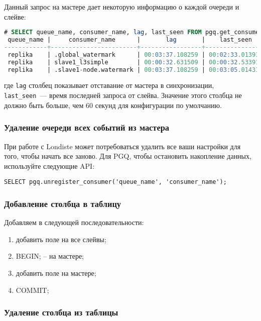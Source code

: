 Данный запрос на мастере дает некоторую информацию о каждой очереди и слейве:

\begin{lstlisting}[language=SQL,label=lst:londiste21,caption=Проверка состояния слейвов]
# SELECT queue_name, consumer_name, lag, last_seen FROM pgq.get_consumer_info();
 queue_name |     consumer_name      |       lag       |    last_seen
------------+------------------------+-----------------+-----------------
 replika    | .global_watermark      | 00:03:37.108259 | 00:02:33.013915
 replika    | slave1_l3simple        | 00:00:32.631509 | 00:00:32.533911
 replika    | .slave1-node.watermark | 00:03:37.108259 | 00:03:05.01431
\end{lstlisting}

где \lstinline!lag! столбец показывает отставание от мастера в синхронизации, \lstinline!last_seen!~--- время последней запроса от слейва. Значение этого столбца не должно быть больше, чем 60 секунд для конфигурации по умолчанию.

\subsubsection{Удаление очереди всех событий из мастера}

При работе с Londiste может потребоваться удалить все ваши настройки для того, чтобы начать все заново. Для PGQ, чтобы остановить накопление данных, используйте следующие API:

\begin{lstlisting}[label=lst:londiste22,caption=Удаление очереди всех событий из мастера]
SELECT pgq.unregister_consumer('queue_name', 'consumer_name');
\end{lstlisting}

\subsubsection{Добавление столбца в таблицу}

Добавляем в следующей последовательности:

\begin{enumerate}
 \item добавить поле на все слейвы;
 \item BEGIN; -- на мастере;
 \item добавить поле на мастере;
 \item COMMIT;
\end{enumerate}

\subsubsection{Удаление столбца из таблицы}

